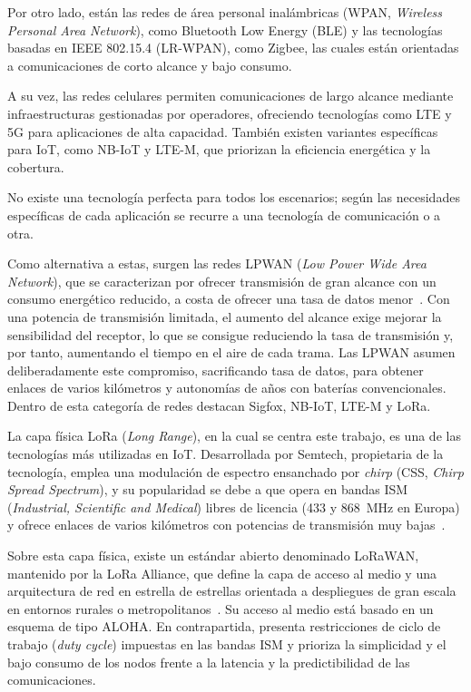 Por otro lado, están las redes de área personal inalámbricas (WPAN, \textit{Wireless Personal Area Network}), como Bluetooth Low Energy (BLE) y las tecnologías basadas en IEEE 802.15.4 (LR-WPAN), como Zigbee, las cuales están orientadas a comunicaciones de corto alcance y bajo consumo.

A su vez, las redes celulares permiten comunicaciones de largo alcance mediante infraestructuras gestionadas por operadores, ofreciendo tecnologías como LTE y 5G para aplicaciones de alta capacidad. También existen variantes específicas para IoT, como NB-IoT y LTE-M, que priorizan la eficiencia energética y la cobertura.

No existe una tecnología perfecta para todos los escenarios; según las necesidades específicas de cada aplicación se recurre a una tecnología de comunicación o a otra.

Como alternativa a estas, surgen las redes LPWAN (\textit{Low Power Wide Area Network}), que se caracterizan por ofrecer transmisión de gran alcance con un consumo energético reducido, a costa de ofrecer una tasa de datos menor~\cite{chaudhari2020lpwan,song2017internet}. Con una potencia de transmisión limitada, el aumento del alcance exige mejorar la sensibilidad del receptor, lo que se consigue reduciendo la tasa de transmisión y, por tanto, aumentando el tiempo en el aire de cada trama. Las LPWAN asumen deliberadamente este compromiso, sacrificando tasa de datos, para obtener enlaces de varios kilómetros y autonomías de años con baterías convencionales. Dentro de esta categoría de redes destacan Sigfox, NB-IoT, LTE-M y LoRa.

La capa física LoRa (\textit{Long Range}), en la cual se centra este trabajo, es una de las tecnologías más utilizadas en IoT. Desarrollada por Semtech, propietaria de la tecnología, emplea una modulación de espectro ensanchado por \textit{chirp} (CSS, \textit{Chirp Spread Spectrum}), y su popularidad se debe a que opera en bandas ISM (\textit{Industrial, Scientific and Medical}) libres de licencia (433 y 868~MHz en Europa) y ofrece enlaces de varios kilómetros con potencias de transmisión muy bajas~\cite{devalal2018lora}.

Sobre esta capa física, existe un estándar abierto denominado LoRaWAN, mantenido por la LoRa Alliance, que define la capa de acceso al medio y una arquitectura de red en estrella de estrellas orientada a despliegues de gran escala en entornos rurales o metropolitanos~\cite{sornin2015lorawan}. Su acceso al medio está basado en un esquema de tipo ALOHA. En contrapartida, presenta restricciones de ciclo de trabajo (\textit{duty cycle}) impuestas en las bandas ISM y prioriza la simplicidad y el bajo consumo de los nodos frente a la latencia y la predictibilidad de las comunicaciones.

